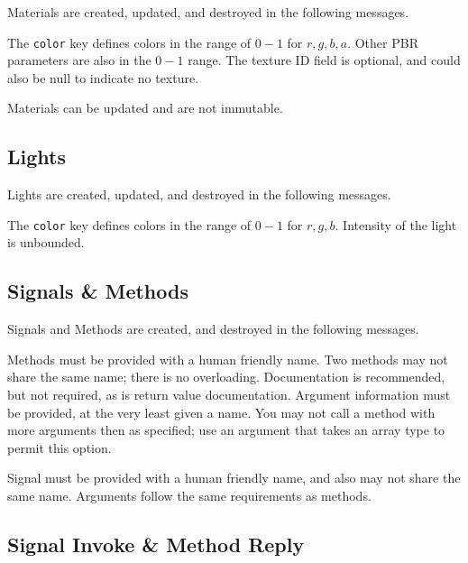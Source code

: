 \documentclass[11pt, oneside]{amsart}
\begin{document}
Materials are created, updated, and destroyed in the following messages.



The \texttt{color} key defines colors in the range of $0 - 1$ for $r,g,b,a$. Other PBR parameters are also in the $0 - 1$ range. The texture ID field is optional, and could also be null to indicate no texture.

Materials can be updated and are not immutable.

\subsection{Lights}

 Lights are created, updated, and destroyed in the following messages.

 

 The \texttt{color} key defines colors in the range of $0 - 1$ for $r,g,b$. Intensity of the light is unbounded.


\subsection{Signals \& Methods}

Signals and Methods are created, and destroyed in the following messages.



Methods must be provided with a human friendly name. Two methods may not share the same name; there is no overloading. Documentation is recommended, but not required, as is return value documentation. Argument information must be provided, at the very least given a name. You may not call a method with more arguments then as specified; use an argument that takes an array type to permit this option.

Signal must be provided with a human friendly name, and also may not share the same name. Arguments follow the same requirements as methods.

\subsection{Signal Invoke \& Method Reply}
\end{document}
